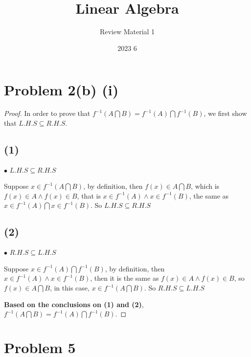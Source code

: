 \documentclass[12pt]{article}
\title{Linear Algebra}
\author{Review Material 1}
\date{2023 6}
\begin{document}
\doublespacing

\section*{Problem 2(b) (i)}

\begin{proof}
    In order to prove that $ f^{-1}(A \bigcap B) = f^{-1}
    (A) \bigcap f^{-1}(B)$, we first show that
    $ L.H.S \subseteq R.H.S $.

    \subsection*{(1)}
    $\bullet$ $L.H.S \subseteq R.H.S $
    

    Suppose $ x \in f^{-1}(A \bigcap B)$, by definition, then
    $f(x) \in A \bigcap B $, which is 
    $ f(x) \in A \land f(x) \in B $, that is
     $ x \in f^{-1}(A) \land x \in f^{-1}(B)$, the same as
     $ x \in f^{-1}(A) \bigcap x \in f^{-1}(B) $.
     So $L.H.S \subseteq R.H.S $

    
    \subsection*{(2)}
    $\bullet$ $R.H.S \subseteq L.H.S $


    Suppose $ x \in f^{-1}(A) \bigcap f^{-1}(B)$, by 
     definition, then 
    $ x \in f^{-1}(A) \land x \in f^{-1}(B)$, then it is
    the same as
    $ f(x) \in A \land f(x) \in B$, so 
    $ f(x) \in A \bigcap B $, in this case,
    $ x \in f^{-1}(A \bigcap B)$. So $R.H.S \subseteq L.H.S $

    \vspace*{2cm}
    \textbf{Based on the conclusions on (1) and (2)},
    $ f^{-1}(A \bigcap B) = f^{-1}
    (A) \bigcap f^{-1}(B)$.
\end{proof}

\newpage
\section*{Problem 5}
\end{document}
